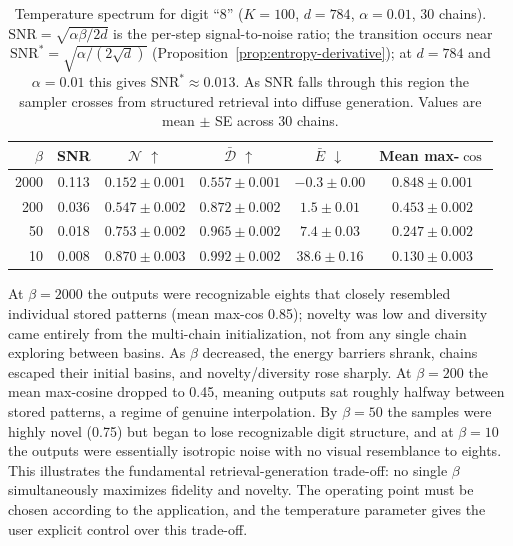 \begin{table}[h]
\centering
\caption{Temperature spectrum for digit ``8'' ($K{=}100$, $d{=}784$, $\alpha{=}0.01$, 30 chains). $\mathrm{SNR}=\sqrt{\alpha\beta/2d}$ is the per-step signal-to-noise ratio; the transition occurs near $\mathrm{SNR}^{*}=\sqrt{\alpha/(2\sqrt{d})}$ (Proposition~\ref{prop:entropy-derivative}); at $d{=}784$ and $\alpha{=}0.01$ this gives $\mathrm{SNR}^{*}\approx 0.013$. As SNR falls through this region the sampler crosses from structured retrieval into diffuse generation. Values are mean $\pm$ SE across 30 chains.}
\label{tab:temp-spectrum-digit8}
\small
\begin{tabular}{@{}rccccc@{}}
\toprule
$\beta$ & SNR & $\mathcal{N}$ $\uparrow$ & $\bar{\mathcal{D}}$ $\uparrow$ & $\bar{E}$ $\downarrow$ & Mean max-$\cos$ \\
\midrule
2000 & 0.113 & $0.152 \pm 0.001$ & $0.557 \pm 0.001$ & $-0.3 \pm 0.00$ & $0.848 \pm 0.001$ \\
200  & 0.036 & $0.547 \pm 0.002$ & $0.872 \pm 0.002$ & $1.5 \pm 0.01$  & $0.453 \pm 0.002$ \\
50   & 0.018 & $0.753 \pm 0.002$ & $0.965 \pm 0.002$ & $7.4 \pm 0.03$  & $0.247 \pm 0.002$ \\
10   & 0.008 & $0.870 \pm 0.003$ & $0.992 \pm 0.002$ & $38.6 \pm 0.16$ & $0.130 \pm 0.003$ \\
\bottomrule
\end{tabular}
\end{table}

At $\beta{=}2000$ the outputs were recognizable eights that closely resembled individual stored patterns (mean max-cos 0.85); novelty was low and diversity came entirely from the multi-chain initialization, not from any single chain exploring between basins.
As $\beta$ decreased, the energy barriers shrank, chains escaped their initial basins, and novelty/diversity rose sharply.
At $\beta{=}200$ the mean max-cosine dropped to 0.45, meaning outputs sat roughly halfway between stored patterns, a regime of genuine interpolation.
By $\beta{=}50$ the samples were highly novel (0.75) but began to lose recognizable digit structure, and at $\beta{=}10$ the outputs were essentially isotropic noise with no visual resemblance to eights.
This illustrates the fundamental retrieval-generation trade-off: no single $\beta$ simultaneously maximizes fidelity and novelty. The operating point must be chosen according to the application, and the temperature parameter gives the user explicit control over this trade-off.

